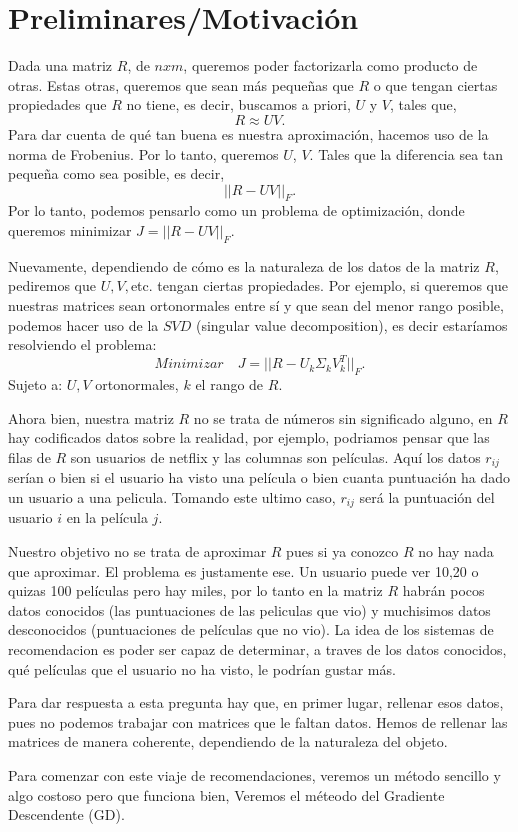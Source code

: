 \chapter{Preliminares/Motivación}

Dada una matriz $R$, de $n x m$, queremos poder factorizarla como producto de otras. Estas otras, queremos que sean más pequeñas que $R$ o que tengan ciertas propiedades que $R$ no tiene, es decir, buscamos a priori, $U$ y $V$, tales que,
$$R \approx UV. $$
Para dar cuenta de qué tan buena es nuestra aproximación, hacemos uso de la norma de Frobenius. Por lo tanto, queremos $U$, $V$. Tales que la diferencia sea tan pequeña como sea posible, es decir,
$$||R - UV||_{F}.$$
Por lo tanto, podemos pensarlo como un problema de optimización, donde queremos minimizar $J=||R - UV||_{F}$.

Nuevamente, dependiendo de cómo es la naturaleza de los datos de la matriz $R$, pediremos que $U,V,$etc.  tengan ciertas propiedades. Por ejemplo, si queremos que nuestras matrices sean ortonormales entre sí y que sean del menor rango posible, podemos hacer uso de la $SVD$ (singular value decomposition), es decir estaríamos resolviendo el problema:
$$Minimizar\quad J = ||R - U_{k}\Sigma_{k} V^{T}_{k}||_{F}.$$
Sujeto a: $U,V$ ortonormales, $k$ el rango de $R$. 


Ahora bien, nuestra matriz $R$ no se trata de números sin significado alguno, en $R$ hay codificados datos sobre la realidad, por ejemplo, podriamos pensar que las filas de $R$ son usuarios de netflix y las columnas son películas. Aquí los datos $r_{ij}$ serían o bien si el usuario ha visto una película o bien cuanta puntuación ha dado un usuario a una pelicula. Tomando este ultimo caso, $r_{ij}$ será la puntuación del usuario $i$ en la película $j$.

Nuestro objetivo no se trata de aproximar $R$ pues si ya conozco $R$ no hay nada que aproximar. El problema es justamente ese. Un usuario puede ver 10,20 o quizas 100 películas pero hay miles, por lo tanto en la matriz $R$ habrán pocos datos conocidos (las puntuaciones de las peliculas que vio) y muchisimos datos desconocidos (puntuaciones de películas que no vio). La idea de los sistemas de recomendacion es poder ser capaz de determinar, a traves de los datos conocidos, qué películas que el usuario no ha visto, le podrían gustar más.

Para dar respuesta a esta pregunta hay que, en primer lugar, rellenar esos datos, pues no podemos trabajar con matrices que le faltan datos. Hemos de rellenar las matrices de manera coherente, dependiendo de la naturaleza del objeto.

Para comenzar con este viaje de recomendaciones, veremos un método sencillo y algo costoso pero que funciona bien, Veremos el méteodo del Gradiente Descendente (GD).